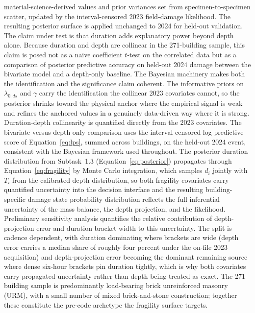 \documentclass[11pt]{article}
\begin{document}
material-science-derived values and prior variances set from specimen-to-specimen
scatter, updated by the interval-censored 2023 field-damage likelihood. The
resulting posterior surface is applied unchanged to 2024 for held-out validation.
The claim under test is that duration adds explanatory power beyond depth alone.
Because duration and depth are collinear in the 271-building sample, this claim is
posed not as a naive coefficient $t$-test on the correlated data but as a
comparison of posterior predictive accuracy on held-out 2024 damage between the
bivariate model and a depth-only baseline. The Bayesian machinery makes both the
identification and the significance claim coherent. The informative priors on
$\lambda_{0,ds}$ and $\gamma$ carry the identification the collinear 2023
covariates cannot, so the posterior shrinks toward the physical anchor where the
empirical signal is weak and refines the anchored values in a genuinely
data-driven way where it is strong.
Duration-depth collinearity is quantified directly from the 2023 covariates.
The bivariate versus depth-only comparison uses the interval-censored log
predictive score of Equation~\eqref{eq:lps}, summed across buildings, on the
held-out 2024 event, consistent with the Bayesian framework used throughout.
The posterior duration distribution from Subtask~1.3 (Equation~\eqref{eq:posterior}) propagates through
Equation~\eqref{eq:fragility} by Monte Carlo integration, which samples $d_i$ jointly with $T_i$ from the
calibrated depth distribution, so both fragility covariates carry quantified uncertainty into the decision
interface and the resulting building-specific damage state probability distribution reflects the full
inferential uncertainty of the mass balance, the depth projection, and the likelihood. Preliminary
sensitivity analysis quantifies the relative contribution of
depth-projection error and duration-bracket width to this uncertainty. The split is cadence dependent,
with duration dominating where brackets are wide (depth error carries a median share of roughly four
percent under the on-file 2023 acquisition) and depth-projection error becoming the dominant remaining
source where dense six-hour brackets pin duration tightly, which is why both covariates carry propagated
uncertainty rather than depth being treated as exact.
The 271-building sample is predominantly load-bearing brick unreinforced masonry
(URM), with a small number of mixed brick-and-stone construction; together these
constitute the pre-code archetype the fragility surface targets.
\end{document}
